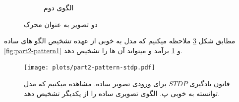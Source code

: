 \begin{figure}[!ht]
\begin{subfigure}[b]{0.35\textwidth}
                \caption{الگوی دوم}
                \label{fig:part2-pattern2}
            \end{subfigure}
            \caption{دو تصویر به عنوان محرک}
            \label{fig:patterns}
        \end{figure}

        مطابق شکل 
        \ref{fig:part2-pattern-stdp} 
        ملاحظه میکنیم که مدل به خوبی از عهده تشخیص الگو های ساده 
        \ref{fig:part2-pattern1} و 
        \ref{fig:part2-pattern2} 
        برآمد و میتواند آن ها را تشخیص دهد.

        \begin{figure}[htbp]
            \centering
            \texttt{[image: plots/part2-pattern-stdp.pdf]} 
            \caption{قانون یادگیری 
            $STDP$ برای ورودی تصویر ساده. 
            مشاهده میکنیم که مدل توانسته به خوبی پ. الگوی تصویری ساده را از یکدیگر تشخیص دهد.
            }
            \label{fig:part2-pattern-stdp}
        \end{figure}


